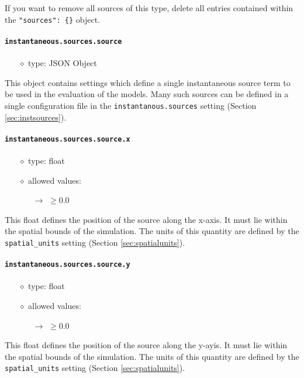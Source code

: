\documentclass[]{article}
\def\code#1{\texttt{#1}}
\begin{document}
\noindent If you want to remove all sources of this type, delete all entries
contained within the \code{"sources": \{\}} object.

\paragraph{\code{instantaneous.sources.source}}\label{sec:instsource}
\begin{itemize}
    \item[$\diamond$] type: JSON Object 
\end{itemize}
This object contains settings which define a single instantaneous source term to
be used in the evaluation of the models. Many such sources can be defined in a
single configuration file in the \code{instantanous.sources} setting (Section
\ref{sec:instsources}).

\paragraph{\code{instantaneous.sources.source.x}}\label{sec:instsourcex}
\begin{itemize}
    \item[$\diamond$] type: float 
    \item[$\diamond$] allowed values:
    \begin{itemize}
        \item[$\rightarrow$] $\geq0.0$
    \end{itemize}
\end{itemize}
This float defines the position of the source along the x-axis. It must lie
within the spatial bounds of the simulation. The units of this quantity are
defined by the \code{spatial\_units} setting (Section \ref{sec:spatialunits}).

\paragraph{\code{instantaneous.sources.source.y}}\label{sec:instsourcey}
\begin{itemize}
    \item[$\diamond$] type: float 
    \item[$\diamond$] allowed values:
    \begin{itemize}
        \item[$\rightarrow$] $\geq0.0$
    \end{itemize}
\end{itemize}
This float defines the position of the source along the y-ayis. It must lie
within the spatial bounds of the simulation. The units of this quantity are
defined by the \code{spatial\_units} setting (Section \ref{sec:spatialunits}).
\end{document}
